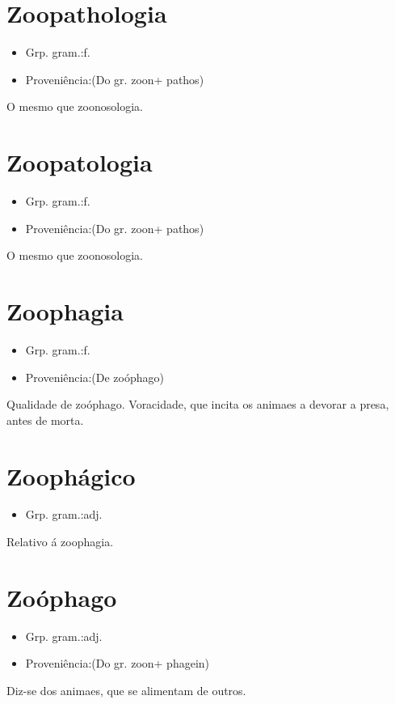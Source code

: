 \section{Zoopathologia}
\begin{itemize}
\item {Grp. gram.:f.}
\end{itemize}
\begin{itemize}
\item {Proveniência:(Do gr. \textunderscore zoon\textunderscore  + \textunderscore pathos\textunderscore )}
\end{itemize}
O mesmo que \textunderscore zoonosologia\textunderscore .
\section{Zoopatologia}
\begin{itemize}
\item {Grp. gram.:f.}
\end{itemize}
\begin{itemize}
\item {Proveniência:(Do gr. \textunderscore zoon\textunderscore  + \textunderscore pathos\textunderscore )}
\end{itemize}
O mesmo que \textunderscore zoonosologia\textunderscore .
\section{Zoophagia}
\begin{itemize}
\item {Grp. gram.:f.}
\end{itemize}
\begin{itemize}
\item {Proveniência:(De \textunderscore zoóphago\textunderscore )}
\end{itemize}
Qualidade de zoóphago.
Voracidade, que incita os animaes a devorar a presa, antes de morta.
\section{Zoophágico}
\begin{itemize}
\item {Grp. gram.:adj.}
\end{itemize}
Relativo á zoophagia.
\section{Zoóphago}
\begin{itemize}
\item {Grp. gram.:adj.}
\end{itemize}
\begin{itemize}
\item {Proveniência:(Do gr. \textunderscore zoon\textunderscore  + \textunderscore phagein\textunderscore )}
\end{itemize}
Diz-se dos animaes, que se alimentam de outros.
